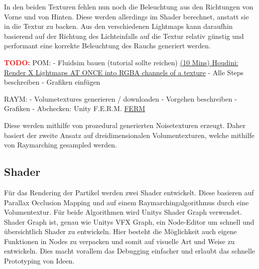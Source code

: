 In den beiden Texturen fehlen nun noch die Beleuchtung aus den Richtungen von Vorne und von Hinten. Diese werden allerdings im Shader
berechnet, anstatt sie in die Textur zu backen. Aus den verschiedenen Lightmaps kann daraufhin basierend auf der Richtung des Lichteinfalls
auf die Textur relativ günstig und performant eine korrekte Beleuchtung des Rauchs generiert werden.







\newpage
\textcolor{red}{\textbf{TODO:}} \newline
POM: \newline
- Fluidsim bauen (tutorial sollte reichen) \href{https://www.youtube.com/watch?v=6bACPGpfItU&t=20s}{(10 Mins) Houdini: Render X Lightmaps AT ONCE into RGBA channels of a texture}\newline
- Alle Steps beschreiben\newline
- Grafiken einfügen\newline

RAYM: \newline
- Volumetextures generieren / downloaden\newline
- Vorgehen beschreiben\newline
- Grafiken \newline
- Abchecken: Unity F.E.R.M. \href{https://forum.unity.com/threads/released-f-e-r-m-toolkit-fast-easy-raymarching-in-unity.655960/}{FERM}\newline


Diese werden mithilfe von prozedural generierten Noisetexturen erzeugt.
Daher basiert der zweite Ansatz auf dreidimensionalen Volumentexturen, welche mithilfe von Raymarching gesampled werden.


\subsection{Shader}
Für das Rendering der Partikel werden zwei Shader entwickelt. Diese basieren auf Parallax Occlusion Mapping und auf einem Raymarchingalgorithmus
durch eine Volumentextur. Für beide Algorithmen wird Unitys Shader Graph verwendet. Shader Graph ist, genau wie Unitys VFX Graph, ein Node-Editor um
schnell und übersichtlich Shader zu entwickeln. Hier besteht die Möglichkeit auch eigene Funktionen in Nodes zu verpacken und somit auf visuelle Art und Weise zu entwickeln.
Dies macht vorallem das Debugging einfacher und erlaubt das schnelle Prototyping von Ideen.

